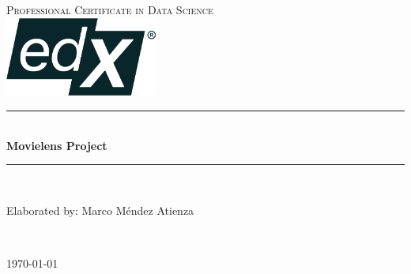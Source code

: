 \begin{titlepage}

\newcommand{\HRule}{\rule{\linewidth}{0.5mm}} 

\center 

\vfill
 
\textsc{\LARGE Professional Certificate in Data Science}\\[1.5cm] 
\includegraphics[width = 5cm]{edx.png}\\

\vfill

\HRule \\[0.4cm]
{ \huge \bfseries Movielens Project}\\[0.4cm]
\HRule \\[1.5cm]

\vfill

\begin{minipage}{0.5\textwidth}
\begin{center} \large
Elaborated by: Marco Méndez Atienza\\ 
\end{center}

\vfill

\end{minipage}\\[2cm]

\vfill

{\large \today}\\[2cm] 

\vfill 

\end{titlepage}
